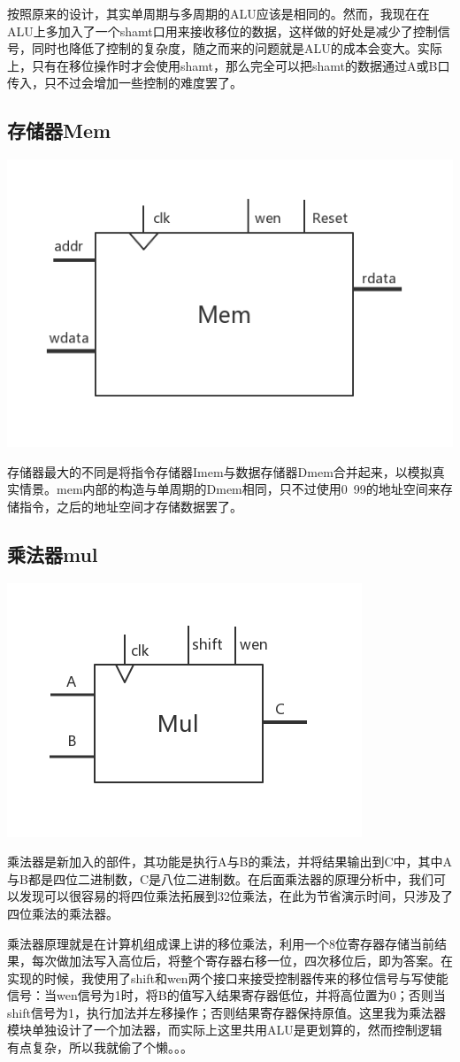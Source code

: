 \documentclass[12pt]{article} %
\begin{document}
\begin{sloppypar}
按照原来的设计，其实单周期与多周期的ALU应该是相同的。然而，我现在在ALU上多加入了一个shamt口用来接收移位的数据，这样做的好处是减少了控制信号，同时也降低了控制的复杂度，随之而来的问题就是ALU的成本会变大。实际上，只有在移位操作时才会使用shamt，那么完全可以把shamt的数据通过A或B口传入，只不过会增加一些控制的难度罢了。

\subsection{存储器Mem}

\includegraphics[width =0.4\linewidth]{figure/mem.jpg}

存储器最大的不同是将指令存储器Imem与数据存储器Dmem合并起来，以模拟真实情景。mem内部的构造与单周期的Dmem相同，只不过使用0~99的地址空间来存储指令，之后的地址空间才存储数据罢了。

\subsection{乘法器mul}

\includegraphics[width =0.4\linewidth]{figure/mul.jpg}

乘法器是新加入的部件，其功能是执行A与B的乘法，并将结果输出到C中，其中A与B都是四位二进制数，C是八位二进制数。在后面乘法器的原理分析中，我们可以发现可以很容易的将四位乘法拓展到32位乘法，在此为节省演示时间，只涉及了四位乘法的乘法器。

乘法器原理就是在计算机组成课上讲的移位乘法，利用一个8位寄存器存储当前结果，每次做加法写入高位后，将整个寄存器右移一位，四次移位后，即为答案。在实现的时候，我使用了shift和wen两个接口来接受控制器传来的移位信号与写使能信号：当wen信号为1时，将B的值写入结果寄存器低位，并将高位置为0；否则当shift信号为1，执行加法并左移操作；否则结果寄存器保持原值。这里我为乘法器模块单独设计了一个加法器，而实际上这里共用ALU是更划算的，然而控制逻辑有点复杂，所以我就偷了个懒。。。


\end{sloppypar}
\end{document}
